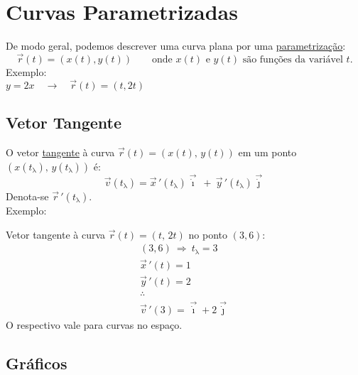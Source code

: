 \documentclass{article}
\begin{document}
\section{Curvas Parametrizadas}
De modo geral, podemos descrever uma curva plana por uma \uline{parametriza\c{c}\~ao}:
\[ \vec{r}(t) = (x(t), y(t)) \qquad \text{onde $x(t)$ e $y(t)$ s\~ao fun\c{c}\~oes da vari\'avel $t$.} \]
Exemplo: \\[-5pt]

$y = 2x \quad \rightarrow \quad \vec{r}(t) = (t, 2t)$

\subsection{Vetor Tangente}
O vetor \uline{tangente} \`a curva $\vec{r}(t) = (x(t),\, y(t))$ em um ponto $(x(t_\uplambda),\, y(t_\uplambda))$ \'e:
\[ \vec{v}(t_\uplambda) = \vec{x}\,'(t_\uplambda)\vec{\dot{\imath}} \> + \> \vec{y}\,'(t_\uplambda)\vec{\dot{\jmath}} \]
Denota-se $\vec{r}\,'(t_\uplambda)$. \\[5pt]
Exemplo:

Vetor tangente \`a curva $\vec{r}(t) = (t,\, 2t)$ no ponto $(3, 6)$:
\begin{gather*}
  (3, 6) \>\Rightarrow\> t_\uplambda = 3 \\[5pt]
  \vec{x}\,'(t) = 1 \\
  \vec{y}\,'(t) = 2 \\
  \therefore \\
  \vec{v}\,'(3) = \vec{\dot{\imath}} + 2\vec{\dot{\jmath}}
\end{gather*}
O respectivo vale para curvas no espa\c{c}o.

\subsection{Gr\'aficos}
\end{document}
